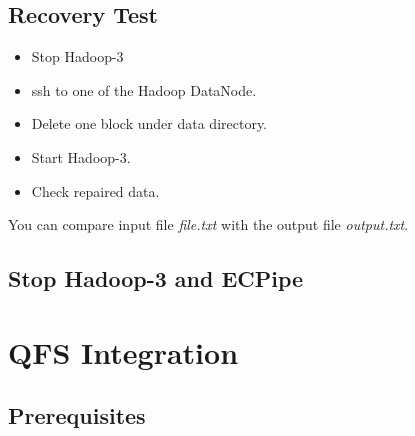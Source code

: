 \documentclass[letterpaper,12pt]{article}
\begin{document}
\begin{itemize}
\subsection{Recovery Test}

\begin{itemize}
\item Stop Hadoop-3
\begin{center}
\noindent{}
\end{center}

\item ssh to one of the Hadoop DataNode.
\item Delete one block under data directory.

\item Start Hadoop-3.
\begin{center}
\noindent{}
\end{center}

\item Check repaired data.

\begin{center}
\noindent{}
\end{center}

\end{itemize}
You can compare input file {\sl file.txt} with the output file {\sl output.txt}.

\subsection{Stop Hadoop-3 and ECPipe}

\begin{center}
\noindent{}
\end{center}

\end{itemize}

\section{QFS Integration}

\subsection{Prerequisites}
\end{document}
